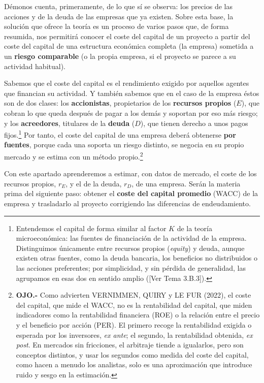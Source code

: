 \documentclass[10pt,a4paper]{article}
\newcommand{\authorfont}[1]{{\fontfamily{EBGaramond-TLF}\selectfont #1}}
\begin{document}
Démonos cuenta, primeramente, de lo que sí se observa: los precios de las acciones y de la deuda de las empresas que ya existen. Sobre esta base, la solución que ofrece la teoría es un proceso de varios pasos que, de forma resumida, nos permitirá conocer el coste del capital de un proyecto a partir del coste del capital de una estructura económica completa (la empresa) sometida a un \textbf{riesgo comparable} (o la propia empresa, si el proyecto se parece a su actividad habitual).

Sabemos que el coste del capital es el rendimiento exigido por aquellos agentes que financian su actividad. Y también sabemos que en el caso de la empresa éstos son de dos clases: los \textbf{accionistas}, propietarios de los \textbf{recursos propios} ($E$), que cobran lo que queda después de pagar a los demás y soportan por eso más riesgo; y los \textbf{acreedores}, titulares de la \textbf{deuda} ($D$), que tienen derecho a unos pagos fijos.\footnote{%
    Entendemos el capital de forma similar al factor $K$ de la teoría microeconómica: las fuentes de financiación de la actividad de la empresa. Distinguimos únicamente entre recursos propios (\textit{equity}) y deuda, aunque existen otras fuentes, como la deuda bancaria, los beneficios no distribuidos o las acciones preferentes; por simplicidad, y sin pérdida de generalidad, las agrupamos en esas dos en sentido amplio ([\authorfont{Ver Tema 3.B.3}]).
} Por tanto, el coste del capital de una empresa deberá obtenerse \textbf{por fuentes}, porque cada una soporta un riesgo distinto, se negocia en su propio mercado y se estima con un método propio.\footnote{%
    \textbf{OJO.-} Como advierten VERNIMMEN, QUIRY y LE FUR (2022), el coste del capital, que mide el WACC, no es la rentabilidad del capital, que miden indicadores como la rentabilidad financiera (ROE) o la relación entre el precio y el beneficio por acción (PER). El primero recoge la rentabilidad exigida o esperada por los inversores, \textit{ex ante}; el segundo, la rentabilidad obtenida, \textit{ex post}. En mercados sin fricciones, el arbitraje tiende a igualarlos, pero son conceptos distintos, y usar los segundos como medida del coste del capital, como hacen a menudo los analistas, solo es una aproximación que introduce ruido y sesgo en la estimación.
}

Con este apartado aprenderemos a estimar, con datos de mercado, el coste de los recursos propios, $r_E$, y el de la deuda, $r_D$, de una empresa. Serán la materia prima del siguiente paso: obtener el \textbf{coste del capital promedio} (WACC) de la empresa y trasladarlo al proyecto corrigiendo las diferencias de endeudamiento.
\end{document}
